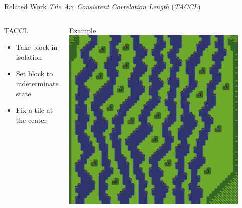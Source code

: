 \documentclass{beamer}
\begin{document}
  \begin{frame}[fragile]{Related Work}
    \textit{Tile Arc Consistent Correlation Length} (\textit{TACCL})
    \begin{columns}[T,onlytextwidth]
        \begin{block}{TACCL}
          \hfill \\
          \begin{itemize}
            \item Take block in isolation
            \item Set block to indeterminate state
            \item Fix a tile at the center
          \end{itemize}
        \end{block}
        \begin{block}{Example}
          \includegraphics[width=0.9\textwidth]{img/forestmicro_64x64.pdf}
        \end{block}
    \end{columns}
  \end{frame}
\end{document}

